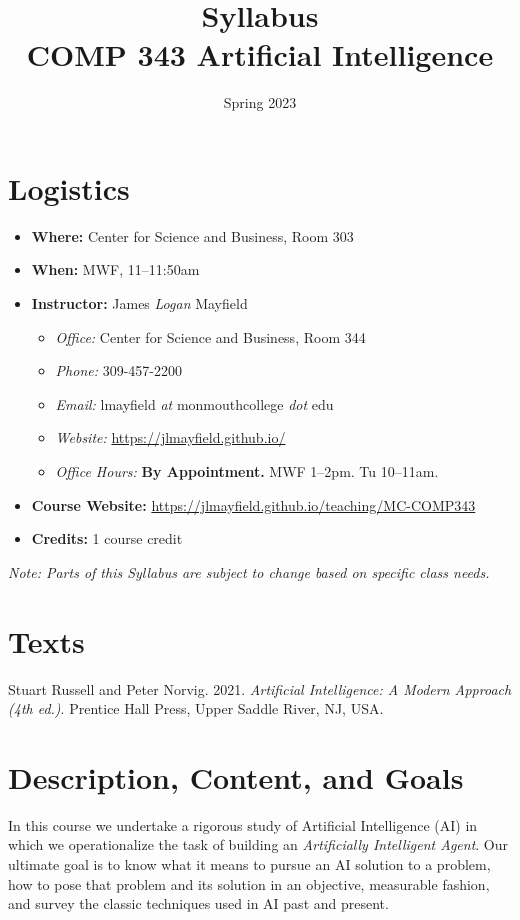 \documentclass[10pt]{article}
\title{Syllabus \\ COMP 343 Artificial Intelligence}
\author{}
\date{Spring 2023}
\begin{document}
\maketitle

\section{Logistics}
\begin{itemize}
\item \textbf{Where: } Center for Science and Business, Room 303
\item \textbf{When: } MWF,  11--11:50am
\item \textbf{Instructor:} James \textit{Logan} Mayfield
\begin{itemize}
\item \textit{Office: } Center for Science and Business, Room 344
\item \textit{Phone: } 309-457-2200 %
\item \textit{Email: } lmayfield \textit{at} monmouthcollege \textit{dot} edu
\item \textit{Website: } \url{https://jlmayfield.github.io/}
\item \textit{Office Hours: } \textbf{By Appointment.} MWF 1--2pm. Tu 10--11am.
\end{itemize}
\item \textbf{Course Website: } \url{https://jlmayfield.github.io/teaching/MC-COMP343}
\item \textbf{Credits: } 1 course credit
\end{itemize}
\emph{Note: Parts of this Syllabus are subject to change based on specific class needs.}

\section{Texts}

\noindent Stuart Russell and Peter Norvig. 2021. \textit{Artificial Intelligence: A Modern Approach (4th ed.)}. Prentice Hall Press, Upper Saddle River, NJ, USA\@.

\section{Description, Content, and Goals}

In this course we undertake a rigorous study of Artificial Intelligence (AI) in which we
operationalize the task of building an \textit{Artificially Intelligent Agent}. Our
ultimate goal is to know what it means to pursue an AI solution to a problem, how
to pose that problem and its solution in an objective, measurable fashion, and
survey the classic techniques used in AI past and present.
\end{document}
